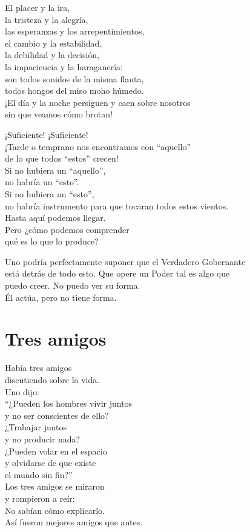 \documentclass[book,b5paper,hidelinks,final]{memoir}
\begin{document}
	El placer y la ira,\\
	la tristeza y la alegría,\\
	las esperanzas y los arrepentimientos,\\
	el cambio y la estabilidad,\\
	la debilidad y la decisión,\\
	la impaciencia y la haraganería:\\
	son todos sonidos de la misma flauta,\\
	todos hongos del miso moho húmedo.\\
	¡El día y la noche persiguen y caen sobre nosotros\\
	sin que veamos cómo brotan!
	
	¡Suficiente! ¡Suficiente!\\
	¡Tarde o temprano nos encontramos con ``aquello''\\
	de lo que todos ``estos'' crecen!\\
	Si no hubiera un ``aquello'',\\
	no habría un ``esto''.\\
	Si no hubiera un ``esto'',\\
	no habría instrumento para que tocaran todos estos vientos.\\
	Hasta aquí podemos llegar.\\
	Pero ¿cómo podemos comprender\\
	qué es lo que lo produce?
	
	Uno podría perfectamente suponer que el Verdadero Gobernante\\
	está detrás de todo esto. Que opere un Poder tal es algo que\\
	puedo creer. No puedo ver su forma.\\
	Él actúa, pero no tiene forma.
	
	\chapter*{Tres amigos}
	
	Había tres amigos\\
	discutiendo sobre la vida.\\
	Uno dijo:\\
	``¿Pueden los hombres vivir juntos\\
	y no ser conscientes de ello?\\
	¿Trabajar juntos\\
	y no producir nada?\\
	¿Pueden volar en el espacio\\
	y olvidarse de que existe\\
	el mundo sin fin?''\\
	Los tres amigos se miraron\\
	y rompieron a reír:\\
	No sabían cómo explicarlo.\\
	Así fueron mejores amigos que antes.
	
\end{document}
